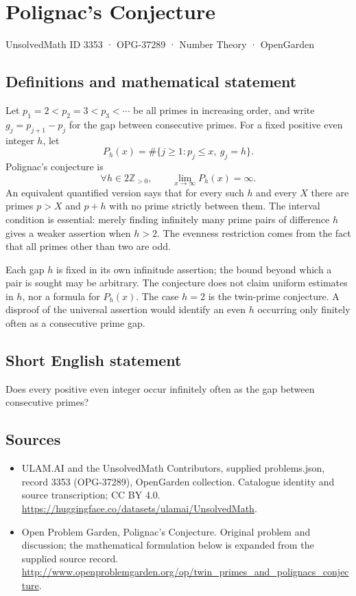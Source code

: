 \documentclass[11pt,a4paper]{article}
\begin{document}
\section*{Polignac's Conjecture}\label{3353}
{\small UnsolvedMath ID 3353 · OPG-37289 · Number Theory · OpenGarden}
\subsection{Definitions and mathematical statement}
Let $p_1=2<p_2=3<p_3<\cdots$ be all primes in increasing order, and
write $g_j=p_{j+1}-p_j$ for the gap between consecutive primes.
For a fixed positive even integer $h$, let
\[
 P_h(x)=\#\{j\ge1:p_j\le x,\ g_j=h\}.
\]
Polignac's conjecture is
\[
 \forall h\in2\mathbb Z_{>0},\qquad
              \lim_{x\to\infty}P_h(x)=\infty.
\]
An equivalent quantified version says that for every such $h$ and
every $X$ there are primes $p>X$ and $p+h$ with no prime strictly
between them. The interval condition is essential: merely finding
infinitely many prime pairs of difference $h$ gives a weaker assertion
when $h>2$. The evenness restriction comes from the fact that all
primes other than two are odd.

Each gap $h$ is fixed in its own infinitude assertion; the bound beyond
which a pair is sought may be arbitrary. The conjecture does not claim
uniform estimates in $h$, nor a formula for $P_h(x)$. The case $h=2$
is the twin-prime conjecture. A disproof of the universal assertion
would identify an even $h$ occurring only finitely often as a consecutive
prime gap.
\subsection{Short English statement}
Does every positive even integer occur infinitely often as the gap between consecutive primes?
\subsection{Sources}
\begin{itemize}
\item[S1] ULAM.AI and the UnsolvedMath Contributors, supplied problems.json, record 3353 (OPG-37289), OpenGarden collection. Catalogue identity and source transcription; CC BY 4.0.
\url{https://huggingface.co/datasets/ulamai/UnsolvedMath}.
\item[S2] Open Problem Garden, Polignac's Conjecture. Original problem and discussion; the mathematical formulation below is expanded from the supplied source record.
\url{http://www.openproblemgarden.org/op/twin_primes_and_polignacs_conjecture}.
\end{itemize}
\end{document}
